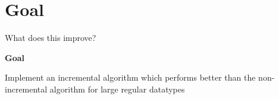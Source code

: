 \section{Goal}

\begin{slide}{What does this improve?}
\begin{center}
  {\huge \textbf{Goal}}
\end{center} 

Implement an incremental algorithm which performs better than the non-incremental algorithm for large regular datatypes

\end{slide}

